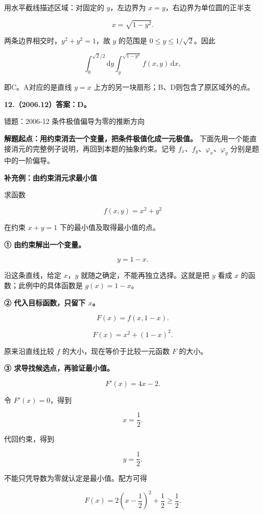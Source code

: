 \documentclass[UTF8,11pt,fontset=windows]{ctexart}
\begin{document}
用水平截线描述区域：对固定的 $y$，左边界为 $x=y$，右边界为单位圆的正半支

$$
x=\sqrt{1-y^2}.
$$

两条边界相交时，$y^2+y^2=1$，故 $y$ 的范围是 $0\le y\le1/\sqrt2$。因此

$$
\boxed{\int_0^{\sqrt2/2}\mathrm dy
\int_y^{\sqrt{1-y^2}}f(x,y)\,\mathrm dx,}
$$

即C。A对应的是直线 $y=x$ 上方的另一块扇形；B、D则包含了原区域外的点。

\clearpage

\textbf{12.（2006.12）答案：D。}

\begingroup\color{gray}错题：2006-12 条件极值偏导为零的推断方向\par\endgroup

\textbf{解题起点：用约束消去一个变量，把条件极值化成一元极值。} 下面先用一个能直接消元的完整例子说明，再回到本题的抽象约束。记号 $f_x$、$f_y$、$\varphi_x$、$\varphi_y$ 分别是题中的一阶偏导。

{\bfseries 补充例：由约束消元求最小值\par}

求函数

$$
f(x,y)=x^2+y^2
$$

在约束 $x+y=1$ 下的最小值及取得最小值的点。

\textbf{① 由约束解出一个变量。}

$$
y=1-x.
$$

沿这条直线，给定 $x$，$y$ 就随之确定，不能再独立选择。这就是把 $y$ 看成 $x$ 的函数；此例中的具体函数是 $g(x)=1-x$。

\textbf{② 代入目标函数，只留下 $x$。}

$$
F(x)=f(x,1-x).
$$

$$
F(x)=x^2+(1-x)^2.
$$

原来沿直线比较 $f$ 的大小，现在等价于比较一元函数 $F$ 的大小。

\textbf{③ 求导找候选点，再验证最小值。}

$$
F'(x)=4x-2.
$$

令 $F'(x)=0$，得到

$$
x=\frac12.
$$

代回约束，得到

$$
y=\frac12.
$$

不能只凭导数为零就认定是最小值。配方可得

$$
F(x)=2\left(x-\frac12\right)^2+\frac12\ge\frac12.
$$
\end{document}
